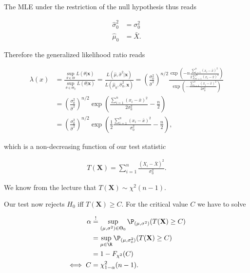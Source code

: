 \begin{solution}
The MLE under the restriction of the null hypothesis thus reads

\begin{align*}
  \hat{\sigma}_0^2 &= \sigma_0^2 \\
  \hat{\mu}_0 &= \bar{X}.
\end{align*}

Therefore the generalized likelihood ratio reads

\begin{align*}
  \lambda(x) &= \frac{\sup_{\theta \in \Theta} L(\theta | \textbf{x})}{\sup_{\theta \in \Theta_0} L(\theta | \textbf{x})}
  = \frac{L(\hat{\mu}, \hat{\sigma}^2 | \textbf{x})}{L(\hat{\mu}_0, \hat{\sigma}^2_0, \textbf{x})} 
  = \left(\frac{\sigma_0^2}{\hat{\sigma}^2}\right)^{n/2}\frac{\exp\left(-n\frac{\sum_{i=1}^n(x_i - \bar{x})^2}{2\sum_{i=1}^n (x_i - \bar{x})^2}\right)}
  {\exp\left(-\frac{\sum_{i=1}^n (x_i - \bar{x})^2}{2\sigma_0^2}\right)} \\
  &= \left(\frac{\sigma_0^2}{\hat{\sigma}^2}\right)^{n/2}\exp\left(\frac{\sum_{i=1}^n (x_i - \bar{x})^2}{2\sigma_0^2}-\frac{n}{2}\right) \\
  &= \left(\frac{\sigma_0^2}{\hat{\sigma}^2}\right)^{n/2}\exp\left(\frac{1}{2}\frac{\sum_{i=1}^n (x_i - \bar{x})^2}{\sigma_0^2}-\frac{n}{2}\right),
\end{align*}

which is a non-decreasing function of our test statistic

\begin{align*}
  T(\textbf{X}) = \sum_{i=1}^n \frac{(X_i - \bar{X})^2}{\sigma_0^2}.
\end{align*}

We know from the lecture that $T(\textbf{X}) \sim  \chi^2(n-1)$.

Our test now rejects $H_0$ iff $T(\textbf{X}) \geq C$.
For the critical value $C$ we have to solve

\begin{align*}
  \alpha &\stackrel{!}{=} \sup_{(\mu, \sigma^2) \in \Theta_0} \P_{(\mu, \sigma^2)}(T(\textbf{X}) \geq C) \\
  &= \sup_{\mu \in \R} \P_{(\mu, \sigma_0^2)}(T(\textbf{X}) \geq C) \\
  &= 1 - F_{\chi^2}(C) \\
  \iff C &= \chi_{1 - \alpha}^2(n-1).
\end{align*}
\end{solution}

